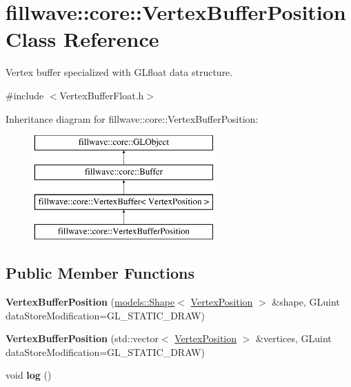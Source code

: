 \hypertarget{classfillwave_1_1core_1_1VertexBufferPosition}{}\section{fillwave\+:\+:core\+:\+:Vertex\+Buffer\+Position Class Reference}
\label{classfillwave_1_1core_1_1VertexBufferPosition}


Vertex buffer specialized with G\+Lfloat data structure.  




{\ttfamily \#include $<$Vertex\+Buffer\+Float.\+h$>$}

Inheritance diagram for fillwave\+:\+:core\+:\+:Vertex\+Buffer\+Position\+:\begin{figure}[H]
\begin{center}
\leavevmode
\includegraphics[height=4.000000cm]{classfillwave_1_1core_1_1VertexBufferPosition}
\end{center}
\end{figure}
\subsection*{Public Member Functions}
\begin{DoxyCompactItemize}
\item 
\hypertarget{classfillwave_1_1core_1_1VertexBufferPosition_acca54bce547b70b588cd57c440a462a6}{}{\bfseries Vertex\+Buffer\+Position} (\hyperlink{classfillwave_1_1models_1_1Shape}{models\+::\+Shape}$<$ \hyperlink{structfillwave_1_1core_1_1VertexPosition}{Vertex\+Position} $>$ \&shape, G\+Luint data\+Store\+Modification=G\+L\+\_\+\+S\+T\+A\+T\+I\+C\+\_\+\+D\+R\+A\+W)\label{classfillwave_1_1core_1_1VertexBufferPosition_acca54bce547b70b588cd57c440a462a6}

\item 
\hypertarget{classfillwave_1_1core_1_1VertexBufferPosition_a252467966f2d6ba19484d23578746db6}{}{\bfseries Vertex\+Buffer\+Position} (std\+::vector$<$ \hyperlink{structfillwave_1_1core_1_1VertexPosition}{Vertex\+Position} $>$ \&vertices, G\+Luint data\+Store\+Modification=G\+L\+\_\+\+S\+T\+A\+T\+I\+C\+\_\+\+D\+R\+A\+W)\label{classfillwave_1_1core_1_1VertexBufferPosition_a252467966f2d6ba19484d23578746db6}

\item 
\hypertarget{classfillwave_1_1core_1_1VertexBufferPosition_aae8467dfc935cd88041c5ad18500b0f0}{}void {\bfseries log} ()\label{classfillwave_1_1core_1_1VertexBufferPosition_aae8467dfc935cd88041c5ad18500b0f0}

\end{DoxyCompactItemize}
